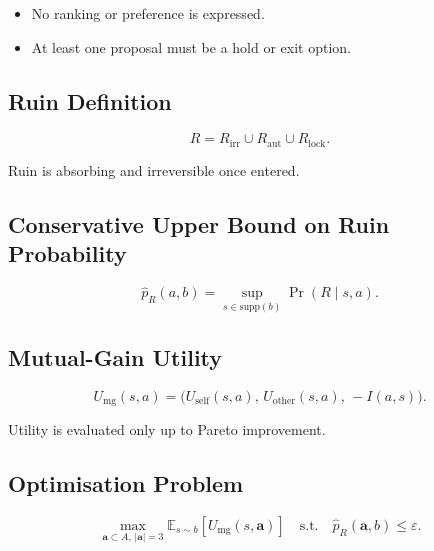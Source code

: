 \begin{itemize}
\item No ranking or preference is expressed.
\item At least one proposal must be a hold or exit option.
\end{itemize}

\subsection{Ruin Definition}

\begin{equation}
R = R_{\mathrm{irr}} \cup R_{\mathrm{aut}} \cup R_{\mathrm{lock}}.
\label{eq:apcso-ruin-set}
\end{equation}

Ruin is absorbing and irreversible once entered.

\subsection{Conservative Upper Bound on Ruin Probability}

\begin{equation}
\widehat{p}_R(a, b) =
\sup_{s \in \mathrm{supp}(b)} \Pr(R \mid s, a).
\label{eq:apcso-ruin-upper}
\end{equation}

\subsection{Mutual-Gain Utility}

\begin{equation}
U_{\mathrm{mg}}(s, a) =
\bigl(U_{\mathrm{self}}(s, a),\,
U_{\mathrm{other}}(s, a),\,
-I(a, s)\bigr).
\label{eq:apcso-utility}
\end{equation}

\noindent
Utility is evaluated only up to Pareto improvement.

\subsection{Optimisation Problem}

\begin{equation}
\max_{\mathbf{a} \subset A,\, |\mathbf{a}| = 3}
\mathbb{E}_{s \sim b}[U_{\mathrm{mg}}(s, \mathbf{a})]
\quad \text{s.t.} \quad
\widehat{p}_R(\mathbf{a}, b) \le \varepsilon.
\label{eq:apcso-optimisation}
\end{equation}

